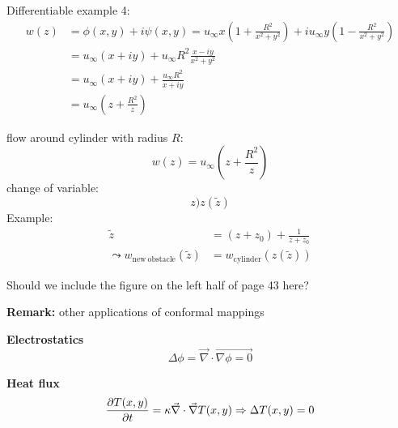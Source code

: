 Differentiable example 4:
\begin{align}
w(z) &= \phi(x,y) +i\psi(x,y) = u_\infty x\left(1+\frac{R^2}{x^2+y^2}\right) + iu_\infty y \left(1-\frac{R^2}{x^2+y^2}\right) \\
& =u_\infty(x+iy) + u_\infty R^2\frac{x-iy}{x^2+y^2} \\
&= u_\infty(x+iy)+\frac{u_\infty R^2}{x+iy}\\
&= u_\infty\left(z+\frac{R^2}{z}\right)
\end{align}

flow around cylinder with radius $R$:
\begin{equation}
w(z)=u_\infty\left(z+\frac{R^2}{z}\right)
\end{equation}
change of variable:
\begin{equation}
z)z(\tilde{z})
\end{equation}
Example:
\begin{align}
\tilde{z} &= (z+z_0)+\frac{1}{z+z_0}\\
\leadsto
w_\mathrm{new\ obstacle}(\tilde{z}) &= w_\mathrm{cylinder}(z(\tilde{z}))
\end{align}

\begin{shaded}
Should we include the figure on the left half of page 43 here?
\end{shaded}


\begin{framed}
\textbf{Remark:} other applications of conformal mappings

\textbf{Electrostatics}
\begin{equation}
\Delta\phi = \vec{\nabla}\cdot\vec{\nabla\phi=0}
\end{equation}

\textbf{Heat flux}
\begin{equation}
\frac{\partial T(x,y)}{\partial t}=\kappa\vec{\nabla}\cdot\vec{\nabla}T(x,y) \Rightarrow \Delta T(x,y) = 0
\end{equation}
\end{framed}
